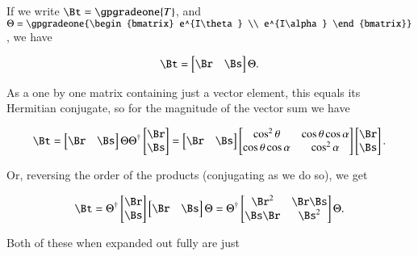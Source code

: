 If we write $\Bt = \gpgradeone{T}$, and $\Theta = \gpgradeone{\begin{bmatrix} e^{I\theta} \\ e^{I\alpha} \end{bmatrix}}$, we have

\begin{align}\label{eqn:gaMintro:mp140}
\Bt = 
\begin{bmatrix}
\Br & \Bs 
\end{bmatrix}
\Theta.
\end{align}

As a one by one matrix containing just a vector element, this equals its Hermitian conjugate, so for the magnitude of the vector sum we have

\begin{align}\label{eqn:gaMintro:mp150}
\Bt 
= 
\begin{bmatrix}
\Br & \Bs 
\end{bmatrix}
\Theta
\Theta^\dagger
\begin{bmatrix}
\Br \\ \Bs 
\end{bmatrix}
=
\begin{bmatrix}
\Br & \Bs 
\end{bmatrix}
\begin{bmatrix}
\cos^2 \theta & \cos\theta \cos\alpha \\
\cos\theta \cos\alpha & \cos^2 \alpha
\end{bmatrix}
\begin{bmatrix}
\Br \\ \Bs 
\end{bmatrix}.
\end{align}

Or, reversing the order of the products (conjugating as we do so), we get

\begin{align}\label{eqn:gaMintro:mp160}
\Bt = 
\Theta^\dagger
\begin{bmatrix}
\Br \\ \Bs 
\end{bmatrix}
\begin{bmatrix}
\Br & \Bs 
\end{bmatrix}
\Theta
=
\Theta^\dagger
\begin{bmatrix}
\Br^2 & \Br\Bs \\
\Bs\Br & \Bs^2
\end{bmatrix}
\Theta.
\end{align}

Both of these when expanded out fully are just


